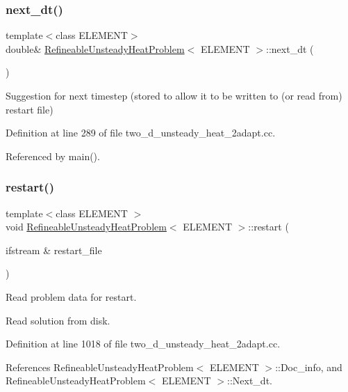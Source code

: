 \subsubsection{\texorpdfstring{next\+\_\+dt()}{next\_dt()}}
{\footnotesize\ttfamily template$<$class E\+L\+E\+M\+E\+NT$>$ \\
double\& \hyperlink{classRefineableUnsteadyHeatProblem}{Refineable\+Unsteady\+Heat\+Problem}$<$ E\+L\+E\+M\+E\+NT $>$\+::next\+\_\+dt (\begin{DoxyParamCaption}{ }\end{DoxyParamCaption})\hspace{0.3cm}{\ttfamily [inline]}}

Suggestion for next timestep (stored to allow it to be written to (or read from) restart file) 

Definition at line 289 of file two\+\_\+d\+\_\+unsteady\+\_\+heat\+\_\+2adapt.\+cc.



Referenced by main().

\mbox{\label{classRefineableUnsteadyHeatProblem_af36fa71e72852367411e21b50b179625}} 
\subsubsection{\texorpdfstring{restart()}{restart()}}
{\footnotesize\ttfamily template$<$class E\+L\+E\+M\+E\+NT $>$ \\
void \hyperlink{classRefineableUnsteadyHeatProblem}{Refineable\+Unsteady\+Heat\+Problem}$<$ E\+L\+E\+M\+E\+NT $>$\+::restart (\begin{DoxyParamCaption}\item[{ifstream \&}]{restart\+\_\+file }\end{DoxyParamCaption})}



Read problem data for restart. 

Read solution from disk. 

Definition at line 1018 of file two\+\_\+d\+\_\+unsteady\+\_\+heat\+\_\+2adapt.\+cc.



References Refineable\+Unsteady\+Heat\+Problem$<$ E\+L\+E\+M\+E\+N\+T $>$\+::\+Doc\+\_\+info, and Refineable\+Unsteady\+Heat\+Problem$<$ E\+L\+E\+M\+E\+N\+T $>$\+::\+Next\+\_\+dt.



